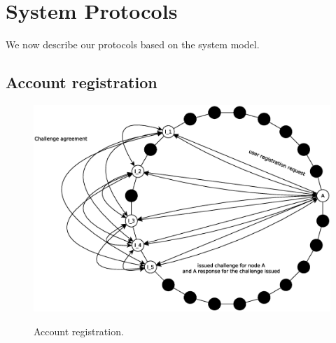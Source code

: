 

\section{System Protocols}
We now describe our protocols based on the system model. 

\subsection{Account registration}

\begin{figure}[!htb]
\centering
\includegraphics[width=14cm]{../img/sign_up}\\
\caption{Account registration.}
\label{fig:sign_up}
\end{figure}


